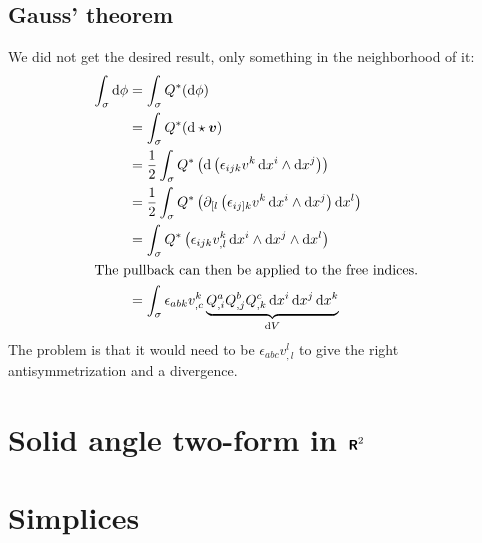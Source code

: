 \documentclass[11pt, english, fleqn, DIV=15, headinclude, BCOR=1cm]{scrartcl}
\begin{document}
\subsection{Gauss' theorem}

We did not get the desired result, only something in the neighborhood of it:
\begin{align*}
    \int_\sigma \dif \phi
    &= \int_\sigma Q^*(\dif \phi) \\
    &= \int_\sigma Q^*(\dif \hodge \vec v) \\
    &= \frac 12 \int_\sigma Q^*\del{\dif \del{\epsilon_{ijk} v^k \dif x^i \wedge \dif
    x^j}} \\
    &= \frac12 \int_\sigma Q^*\del{\partial_{[l} \del{\epsilon_{ij]k} v^k \dif x^i \wedge \dif
    x^j} \dif x^l} \\
    &= \int_\sigma Q^*\del{\epsilon_{ijk} v^k_{,l} \dif x^i \wedge \dif
    x^j \wedge \dif x^l} \\
    \intertext{%
        The pullback can then be applied to the free indices.
    }
    &= \int_\sigma \epsilon_{abk} v^k_{,c} \underbrace{Q^a_{,i} Q^b_{,j} Q^c_{,k} \dif x^i
    \dif x^j \dif x^k}_{\dif V}
\end{align*}
The problem is that it would need to be $\epsilon_{abc} v^l_{,l}$ to give the
right antisymmetrization and a divergence.

\section{Solid angle two-form in $\text{\bfseries\sffamily R}^2$}
\label{homework:2}

\section{Simplices}
\label{homework:3}
\end{document}
